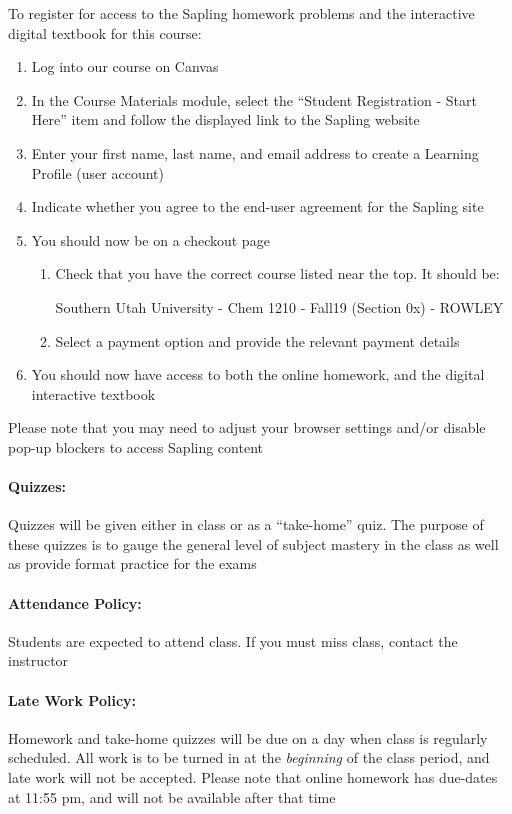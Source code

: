 \documentclass[12pt, letterpaper]{article}
\begin{document}
\noindent To register for access to the Sapling homework problems and the interactive digital textbook for this course:
\begin{enumerate}
	
  \item Log into our course on Canvas
  \item In the Course Materials module, select the ``Student Registration - Start Here'' item and follow the displayed link to the Sapling website
  \item Enter your first name, last name, and email address to create a Learning Profile (user account)
  \item Indicate whether you agree to the end-user agreement for the Sapling site
  \item You should now be on a checkout page
  \begin{enumerate}
  	\item Check that you have the correct course listed near the top. It should be:
  	
  	Southern Utah University - Chem 1210 - Fall19 (Section 0x) - ROWLEY
  	\item Select a payment option and provide the relevant payment details
  \end{enumerate}
  \item You should now have access to both the online homework, and the digital interactive textbook
\end{enumerate}
 
 \noindent Please note that you may need to adjust your browser settings and/or disable pop-up blockers to access Sapling content
 
\paragraph{Quizzes:}
Quizzes will be given either in class or as a ``take-home'' quiz. The purpose of these quizzes is to gauge the general level of subject mastery in the class as well as provide format practice for the exams

\paragraph{Attendance Policy:}
Students are expected to attend class. If you must miss class, contact the instructor

\paragraph{Late Work Policy:}
Homework and take-home quizzes will be due on a day when class is regularly scheduled. All work is to be turned in at the \emph{beginning} of the class period, and late work will not be accepted. Please note that online homework has due-dates at 11:55 pm, and will not be available after that time
\end{document}
